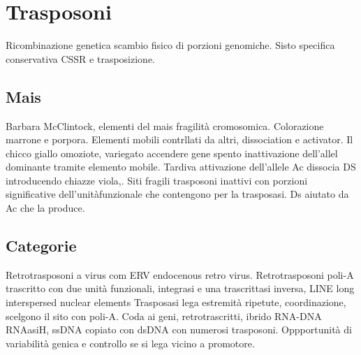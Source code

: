\chapter{Trasposoni}
Ricombinazione genetica scambio fisico di porzioni genomiche.
Sisto specifica conservativa CSSR e trasposizione.

\section{Mais}
Barbara McClintock, elementi del mais fragilit\`a cromosomica.
Colorazione marrone e porpora.
Elementi mobili contrllati da altri, dissociation e activator.
Il chicco giallo omoziote, variegato accendere gene spento inattivazione dell'allel dominante tramite elemento mobile.
Tardiva attivazione dell'allele Ac dissocia DS introducendo chiazze viola,.
Siti fragili trasposoni inattivi con porzioni significative dell'unit\` afunzionale che contengono per la trasposasi.
Ds aiutato da Ac che la produce.

\section{Categorie}
Retrotrasposoni a virus com ERV endocenous retro virus.
Retrotrasposoni poli-A trascritto con due unit\`a funzionali, integrasi e una trascrittasi inversa, LINE long interspersed nuclear elements
Trasposasi lega estremit\`a ripetute, coordinazione, scelgono il sito con poli-A.
Coda ai geni, retrotrascritti, ibrido RNA-DNA RNAasiH, ssDNA copiato con dsDNA con numerosi trasposoni.
Oppportunit\`a di variabilit\`a genica e controllo se si lega vicino a promotore.
